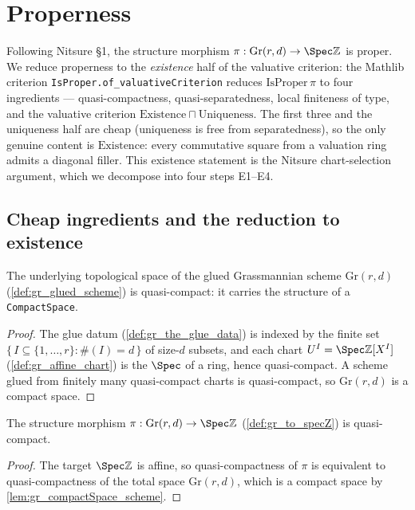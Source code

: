 \section{Properness}
\label{sec:gr_proper}

Following Nitsure \S 1, the structure morphism \(\pi : \mathrm{Gr}(r,d) \to \Spec
\mathbb{Z}\) is proper. We reduce properness to the \emph{existence} half of the
valuative criterion: the Mathlib criterion \texttt{IsProper.of\_valuativeCriterion}
reduces \(\mathrm{IsProper}\,\pi\) to four ingredients --- quasi-compactness,
quasi-separatedness, local finiteness of type, and the valuative criterion
\(\mathrm{Existence} \sqcap \mathrm{Uniqueness}\). The first three and the
uniqueness half are cheap (uniqueness is free from separatedness), so the only
genuine content is \(\mathrm{Existence}\): every commutative square from a
valuation ring admits a diagonal filler. This existence statement is the Nitsure
chart-selection argument, which we decompose into four steps E1--E4.

\subsection*{Cheap ingredients and the reduction to existence}

\begin{lemma}

  \label{lem:gr_compactSpace_scheme}
  The underlying topological space of the glued Grassmannian scheme
  \(\mathrm{Gr}(r,d)\) (\cref{def:gr_glued_scheme}) is quasi-compact: it carries the
  structure of a \texttt{CompactSpace}.
\end{lemma}
\begin{proof}
  \leanok
  The glue datum (\cref{def:gr_the_glue_data}) is indexed by the finite set
  \(\{\, I \subseteq \{1,\dots,r\} : \#(I) = d \,\}\) of size-\(d\) subsets, and
  each chart \(U^I = \Spec \mathbb{Z}[X^I]\) (\cref{def:gr_affine_chart}) is the
  \(\Spec\) of a ring, hence quasi-compact. A scheme glued from finitely many
  quasi-compact charts is quasi-compact, so \(\mathrm{Gr}(r,d)\) is a compact
  space.
\end{proof}

\begin{lemma}

  \label{lem:gr_quasiCompact_toSpecZ}
  The structure morphism \(\pi : \mathrm{Gr}(r,d) \to \Spec \mathbb{Z}\)
  (\cref{def:gr_to_specZ}) is quasi-compact.
\end{lemma}
\begin{proof}
  \leanok
  The target \(\Spec \mathbb{Z}\) is affine, so quasi-compactness of \(\pi\) is
  equivalent to quasi-compactness of the total space \(\mathrm{Gr}(r,d)\), which is
  a compact space by \cref{lem:gr_compactSpace_scheme}.
\end{proof}

